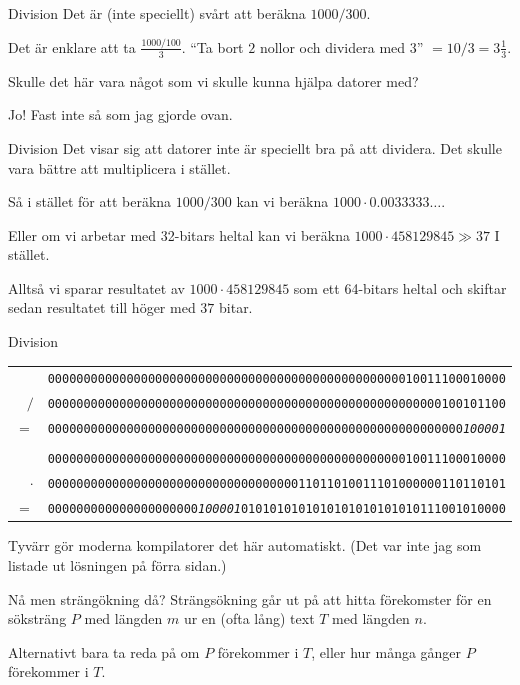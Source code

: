 \documentclass[11pt, aspectratio=169, table]{beamer}
\begin{document}
\begin{frame}{Division}
\setlength{\parskip}{\fill}
Det är (inte speciellt) svårt att beräkna $1000 / 300$.

Det är enklare att ta $\frac{1000 / 100}{3}$. ``Ta bort $2$ nollor och dividera med $3$'' $ = 10 / 3 = 3\frac{1}{3}$.

Skulle det här vara något som vi skulle kunna hjälpa datorer med?

\pause
Jo! Fast inte så som jag gjorde ovan.
\end{frame}

\begin{frame}{Division}
\setlength{\parskip}{\fill}
Det visar sig att datorer inte är speciellt bra på att dividera. Det skulle vara bättre att multiplicera i stället.

Så i stället för att beräkna $1000 / 300$ kan vi beräkna $1000 \cdot 0.0033333\ldots$.

Eller om vi arbetar med 32-bitars heltal kan vi beräkna $1000 \cdot 458129845 \gg 37$ I stället.

Alltså vi sparar resultatet av $1000 \cdot 458129845$ som ett 64-bitars heltal och skiftar sedan resultatet till höger med $37$ bitar.
\end{frame}

\begin{frame}[fragile]{Division}
\setlength{\parskip}{\fill}
\begin{tabular}{r c}
 & \texttt{0000000000000000000000000000000000000000000000000010011100010000} \\
$/$ & \texttt{0000000000000000000000000000000000000000000000000000000100101100} \\
\hline
$=$ & \texttt{0000000000000000000000000000000000000000000000000000000000}{\em\texttt{100001}} \\
\\
 & \texttt{0000000000000000000000000000000000000000000000000010011100010000} \\
$\cdot$ & \texttt{0000000000000000000000000000000000011011010011101000000110110101} \\
\hline
$=$ & \texttt{000000000000000000000}{\em\texttt{100001}}\texttt{0101010101010101010101010111001010000}
\end{tabular}

Tyvärr gör moderna kompilatorer det här automatiskt. (Det var inte jag som listade ut lösningen på förra sidan.)
\end{frame}

\begin{frame}{Nå men strängökning då?}
\setlength{\parskip}{\fill}
Strängsökning går ut på att hitta förekomster för en söksträng $P$ med längden $m$ ur en (ofta lång) text $T$ med längden $n$.

Alternativt bara ta reda på om $P$ förekommer i $T$, eller hur många gånger $P$ förekommer i $T$.
\end{frame}
\end{document}
